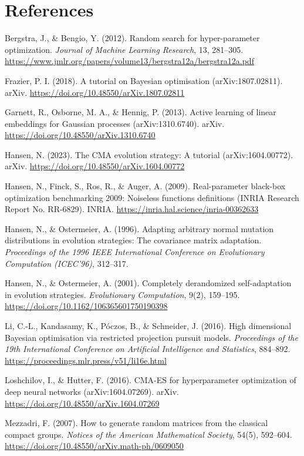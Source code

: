 \documentclass[11pt]{article}
\begin{document}
\section*{References}
\begin{small}
\setlength{\parskip}{0.3em}

Bergstra, J., \& Bengio, Y. (2012). Random search for hyper-parameter optimization. \emph{Journal of Machine Learning Research}, 13, 281--305. \url{https://www.jmlr.org/papers/volume13/bergstra12a/bergstra12a.pdf}

Frazier, P. I. (2018). A tutorial on Bayesian optimisation (arXiv:1807.02811). arXiv. \url{https://doi.org/10.48550/arXiv.1807.02811}

Garnett, R., Osborne, M. A., \& Hennig, P. (2013). Active learning of linear embeddings for Gaussian processes (arXiv:1310.6740). arXiv. \url{https://doi.org/10.48550/arXiv.1310.6740}

Hansen, N. (2023). The CMA evolution strategy: A tutorial (arXiv:1604.00772). arXiv. \url{https://doi.org/10.48550/arXiv.1604.00772}

Hansen, N., Finck, S., Ros, R., \& Auger, A. (2009). Real-parameter black-box optimization benchmarking 2009: Noiseless functions definitions (INRIA Research Report No. RR-6829). INRIA. \url{https://inria.hal.science/inria-00362633}

Hansen, N., \& Ostermeier, A. (1996). Adapting arbitrary normal mutation distributions in evolution strategies: The covariance matrix adaptation. \emph{Proceedings of the 1996 IEEE International Conference on Evolutionary Computation (ICEC'96)}, 312--317.

Hansen, N., \& Ostermeier, A. (2001). Completely derandomized self-adaptation in evolution strategies. \emph{Evolutionary Computation}, 9(2), 159--195. \url{https://doi.org/10.1162/106365601750190398}

Li, C.-L., Kandasamy, K., P\'oczos, B., \& Schneider, J. (2016). High dimensional Bayesian optimisation via restricted projection pursuit models. \emph{Proceedings of the 19th International Conference on Artificial Intelligence and Statistics}, 884--892. \url{https://proceedings.mlr.press/v51/li16e.html}

Loshchilov, I., \& Hutter, F. (2016). CMA-ES for hyperparameter optimization of deep neural networks (arXiv:1604.07269). arXiv. \url{https://doi.org/10.48550/arXiv.1604.07269}

Mezzadri, F. (2007). How to generate random matrices from the classical compact groups. \emph{Notices of the American Mathematical Society}, 54(5), 592--604. \url{https://doi.org/10.48550/arXiv.math-ph/0609050}


\end{small}
\end{document}
